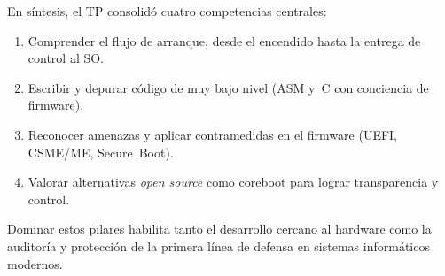 En síntesis, el TP consolidó cuatro competencias centrales:
\begin{enumerate}
  \item Comprender el flujo de arranque, desde el encendido hasta la entrega de control al SO.
  \item Escribir y depurar código de muy bajo nivel (ASM y~C con conciencia de firmware).
  \item Reconocer amenazas y aplicar contramedidas en el firmware (UEFI, CSME/ME, Secure Boot).
  \item Valorar alternativas \emph{open source} como coreboot para lograr transparencia y control.
\end{enumerate}

Dominar estos pilares habilita tanto el desarrollo cercano al hardware como la auditoría y protección de la primera línea de defensa en sistemas informáticos modernos.

